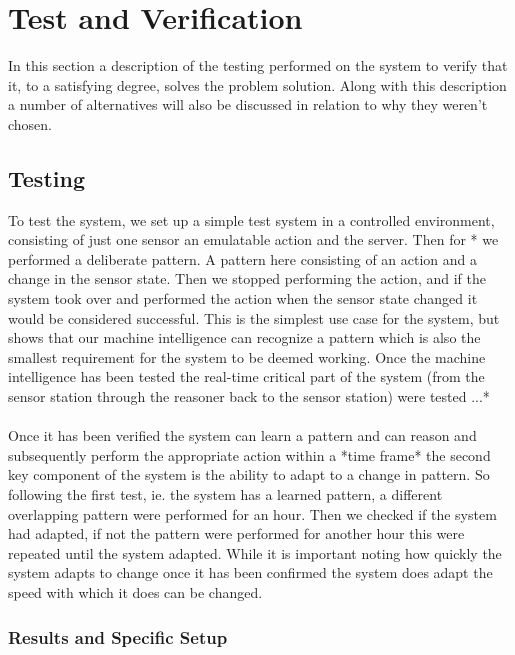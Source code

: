 \section{Test and Verification}
In this section a description of the testing performed on the system to verify that it, to a satisfying degree, solves the problem solution. Along with this description a number of alternatives will also be discussed in relation to why they weren't chosen.

\subsection{Testing}
To test the system, we set up a simple test system in a controlled environment, consisting of just one sensor an emulatable action and the server. Then for * we performed a deliberate pattern. A pattern here consisting of an action and a change in the sensor state. Then we stopped performing the action, and if the system took over and performed the action when the sensor state changed it would be considered successful. This is the simplest use case for the system, but shows that our machine intelligence can recognize a pattern which is also the smallest requirement for the system to be deemed working. Once the machine intelligence has been tested the real-time critical part of the system (from the sensor station through the reasoner back to the sensor station) were tested ...*
\\\\
Once it has been verified the system can learn a pattern and can reason and subsequently perform the appropriate action within a *time frame* the second key component of the system is the ability to adapt to a change in pattern. So following the first test, ie. the system has a learned pattern, a different overlapping pattern were performed for an hour. Then we checked if the system had adapted, if not the pattern were performed for another hour this were repeated until the system adapted. While it is important noting how quickly the system adapts to change once it has been confirmed the system does adapt the speed with which it does can be changed.
\subsubsection{Results and Specific Setup}

